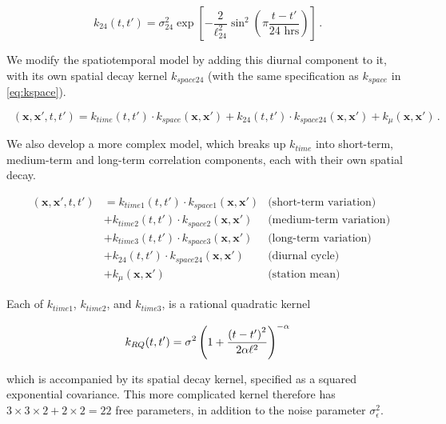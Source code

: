 \documentclass[letter]{article}
\newcommand{\genericdel}[3]{%
      \left#1#3\right#2
    }
\newcommand{\del}[1]{\genericdel(){#1}}
\newcommand{\sbr}[1]{\genericdel[]{#1}}
\newcommand{\xvec}{\mathbold{x}}
\newcommand{\sigman}{\sigma_{\epsilon}}
\DeclareMathOperator{\kdiurn}{k_{\mathtt{SESE_{24}}}}
\DeclareMathOperator{\ksumprod}{k_{\mathtt{sumprod}}}
\newcommand{\eqlabel}[1]{\label{#1}}
\begin{document}
\begin{equation}
    k_{24}(t,t') = \sigma_{24}^2 \exp\sbr{ - \frac{2}{\ell_{24}^2} \sin^2\del{
        \pi \frac{t-t'}{\text{24 hrs}} 
        }}\,.
\end{equation}

We modify the spatiotemporal model by adding this diurnal component to it, with its own spatial decay kernel \(k_{space24}\) (with the same specification as \(k_{space}\) in \eqref{eq:kspace}).

\begin{equation}
    \kdiurn(\xvec,\xvec',t,t') = k_{time}(t,t') \cdot k_{space}(\xvec, \xvec') 
        + k_{24}(t,t') \cdot k_{space24}(\xvec, \xvec')
        + k_\mu(\xvec, \xvec') 
        \,.
\end{equation}
    


        We also develop a more complex model, which breaks up \(k_{time}\) into short-term, medium-term and long-term correlation components, each with their own spatial decay.

\begin{equation}
\eqlabel{eq:sumprod_kernel}
\begin{aligned}
    \ksumprod(\xvec,\xvec',t,t') &= 
           k_{time1}(t,t') \cdot k_{space1}(\xvec, \xvec')  &\text{(short-term variation)} \\
        &+ k_{time2}(t,t') \cdot k_{space2}(\xvec, \xvec')  &\text{(medium-term variation)} \\
        &+ k_{time3}(t,t') \cdot k_{space3}(\xvec, \xvec')  &\text{(long-term variation)} \\
        &+ k_{24}(t,t') \cdot k_{space24}(\xvec, \xvec') &\text{(diurnal cycle)} \\
        &+ k_\mu(\xvec, \xvec') &\text{(station mean)}
\end{aligned}
\end{equation}

Each of \(k_{time1}\), \(k_{time2}\), and \(k_{time3}\), is a rational quadratic kernel

\begin{equation}
    k_{RQ}(t,t') = \sigma^2 \del{1 + \frac{\del{t-t'}^2}{2\alpha\ell^2} }^{-\alpha}
\end{equation}

which is accompanied by its spatial decay kernel, specified as a squared exponential covariance.
This more complicated kernel therefore has \(3 \times 3 \times 2 + 2 \times 2 = 22\) free parameters, in addition to the noise parameter \(\sigman^2\).
\end{document}
